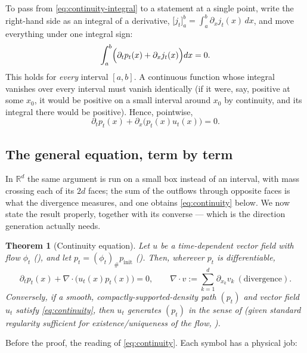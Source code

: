\documentclass[11pt,a4paper]{report}
\newtheorem{theorem}{Theorem}[chapter]
\theoremstyle{definition}
\theoremstyle{remark}
\newcommand{\RR}{\mathbb R}
\begin{document}
To pass from \eqref{eq:continuity-integral} to a statement at a single
point, write the right-hand side as an integral of a derivative,
$\bigl[j_t\bigr]_a^b=\int_a^b\partial_xj_t(x)\,dx$, and move everything
under one integral sign:
\[
\int_a^b\Bigl(\partial_tp_t(x)+\partial_xj_t(x)\Bigr)dx = 0 .
\]
This holds for \emph{every} interval $[a,b]$. A continuous function whose
integral vanishes over every interval must vanish identically (if it were,
say, positive at some $x_0$, it would be positive on a small interval
around $x_0$ by continuity, and its integral there would be positive).
Hence, pointwise,
\begin{equation}
\label{eq:continuity-1d-fm}
\partial_tp_t(x)+\partial_x\bigl(p_t(x)u_t(x)\bigr)=0 .
\end{equation}

\subsection{The general equation, term by term}

In $\RR^d$ the same argument is run on a small box instead of an interval,
with mass crossing each of its $2d$ faces; the sum of the outflows through
opposite faces is what the divergence measures, and one obtains
\eqref{eq:continuity} below. We now state the result properly, together
with its converse --- which is the direction generation actually needs.

\begin{theorem}[Continuity equation]
\label{thm:continuity}
Let $u$ be a time-dependent vector field with flow $\phi_t$
(), and let $p_t=(\phi_t)_\#p_{\mathrm{init}}$
(). Then, wherever $p_t$ is differentiable,
\begin{equation}
\label{eq:continuity}
\partial_tp_t(x) + \nabla\cdot\bigl(u_t(x)p_t(x)\bigr) = 0 ,
\qquad
\nabla\cdot v := \sum_{k=1}^d\partial_{x_k}v_k \ (\text{divergence}) .
\end{equation}
Conversely, if a smooth, compactly-supported-density path $(p_t)$ and
vector field $u_t$ satisfy \eqref{eq:continuity}, then $u_t$ generates
$(p_t)$ in the sense of  (given standard regularity
sufficient for existence/uniqueness of the flow, ).
\end{theorem}

Before the proof, the reading of \eqref{eq:continuity}. Each symbol has a
physical job:
\end{document}
